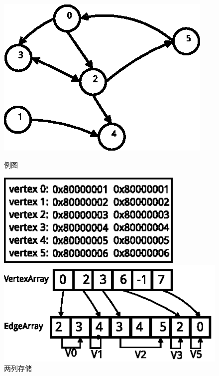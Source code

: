 \begin{figure}[htbp]
\centering
\begin{minipage}{0.4\textwidth}
\centering
\includegraphics[width=\textwidth]{myfigures/graph.eps}
\caption{例图}\label{fig:graph}
\end{minipage}
\begin{minipage}{0.4\textwidth}
\centering
\includegraphics[width=0.8\textwidth]{myfigures/twocol.eps}
\caption{两列存储}\label{fig:twocol}
\end{minipage}
\begin{minipage}{0.4\textwidth}
\centering
\includegraphics[width=\textwidth]{myfigures/csr.eps}

\end{minipage}
\end{figure}
